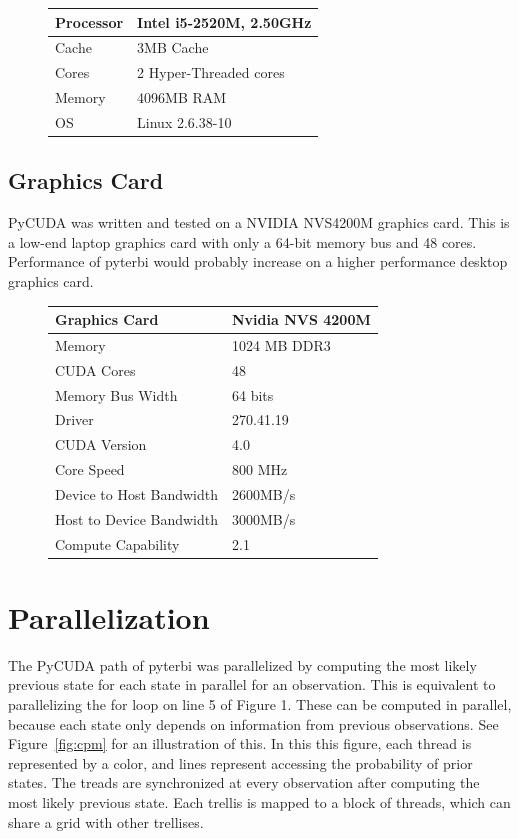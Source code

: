 \documentclass[journal,onecolumn]{IEEEtran}
\begin{document}
    \begin{figure}[!h]
            \begin{tabular}{ | l | l |}
                \hline
                Processor & Intel i5-2520M, 2.50GHz \\ \hline
                Cache & 3MB Cache \\ \hline
                Cores & 2 Hyper-Threaded cores \\ \hline
                Memory & 4096MB RAM \\ \hline
                OS & Linux 2.6.38-10 \\ \hline
            \end{tabular}
    \end{figure}
    
\subsection{Graphics Card}
    PyCUDA was written and tested on a NVIDIA NVS4200M graphics card. This is a low-end laptop graphics card with only a 64-bit memory bus and 48 cores. Performance of pyterbi would probably increase on a higher performance desktop graphics card. 
     \begin{figure}[!h]
            \begin{tabular}{ | l | l |}
                \hline
                Graphics Card& Nvidia NVS 4200M \\ \hline
                Memory & 1024 MB DDR3\\ \hline
                CUDA Cores & 48 \\ \hline
                Memory Bus Width & 64 bits\\ \hline
                Driver & 270.41.19 \\ \hline
                CUDA Version & 4.0 \\ \hline
                Core Speed & 800 MHz \\ \hline
                Device to Host Bandwidth & 2600MB/s \\ \hline
                Host to Device Bandwidth & 3000MB/s \\ \hline
                Compute Capability & 2.1 \\ \hline
            \end{tabular}
    \end{figure}

\section{Parallelization}
        The PyCUDA path of pyterbi was parallelized by computing the most likely previous state for each state in parallel for an observation. This is equivalent to parallelizing the for loop on line 5 of Figure 1. These can be computed in parallel, because each state only depends on information from previous observations. See Figure~\ref{fig:cpm} for an illustration of this. In this this figure, each thread is represented by a color, and lines represent accessing the probability of prior states. The treads are synchronized at every observation after computing the most likely previous state. Each trellis is mapped to a block of threads, which can share a grid with other trellises. 
\end{document}
